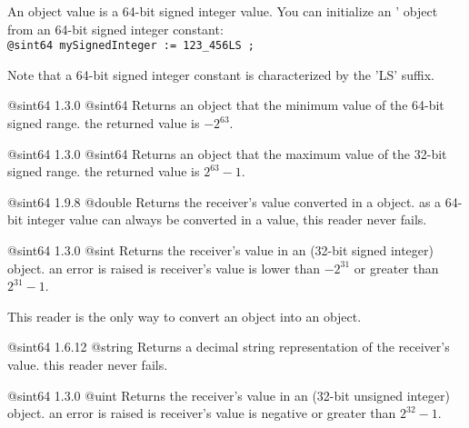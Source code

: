 
An  object value is a 64-bit signed integer value. You can initialize an ' object from an 64-bit signed integer constant:\\

\texttt{@sint64 mySignedInteger := 123\_456LS ;}

Note that a 64-bit signed integer constant is characterized by the 'LS' suffix.




{@sint64}
{1.3.0}
{@sint64}
{Returns an  object that the minimum value of the 64-bit signed range.}
{the returned value is $-2^{63}$.}





{@sint64}
{1.3.0}
{@sint64}
{Returns an  object that the maximum value of the 32-bit signed range.}
{the returned value is $2^{63}-1$.}





{@sint64}
{1.9.8}
{@double}
{Returns the receiver's value converted in a  object.}
{as a 64-bit integer value can always be converted in a  value, this reader never fails.}




{@sint64}
{1.3.0}
{@sint}
{Returns the receiver's value in an  (32-bit signed integer) object.}
{an error is raised is receiver's value is lower than $-2^{31}$ or greater than $2^{31}-1$.}

This reader is the only way to convert an  object into an  object.





{@sint64}
{1.6.12}
{@string}
{Returns a decimal string representation of the receiver's value.}
{this reader never fails.}








{@sint64}
{1.3.0}
{@uint}
{Returns the receiver's value in an  (32-bit unsigned integer) object.}
{an error is raised is receiver's value is negative or greater than $2^{32}-1$.}


